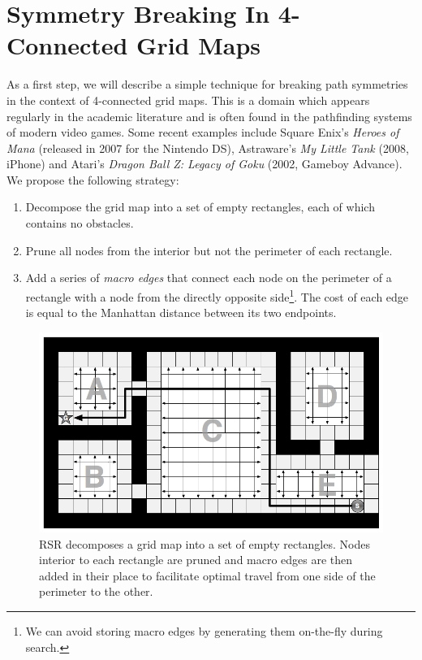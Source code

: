 \section{Symmetry Breaking In 4-Connected Grid Maps}
\label{cha::rsr::symm4c}

As a first step, we will describe a simple technique for breaking path symmetries 
in the context of 4-connected grid maps.
This is a domain which appears regularly in the academic literature
\citep{yap02,wang08,pochter10} and is often found in the pathfinding systems of
modern video games.  Some recent examples include Square Enix's \emph{Heroes of
Mana} (released in 2007 for the Nintendo DS), Astraware's \emph{My Little Tank}
(2008, iPhone) and Atari's \emph{Dragon Ball Z: Legacy of Goku} (2002, Gameboy
Advance). We propose the following strategy:

\begin{enumerate}
\item{Decompose the grid map into a set of empty rectangles, each of which contains no obstacles.}
\item{Prune all nodes from the interior but not the perimeter of each rectangle.}
\item{Add a series of \emph{macro edges} that connect each node on the perimeter of a rectangle
with a node from the directly opposite side\footnote{We can avoid storing macro edges by 
generating them on-the-fly during search.}.
The cost of each edge is equal to the Manhattan distance between its two endpoints.
}
\end{enumerate}

\begin{figure}[t]
\begin{center}
\includegraphics[scale=0.30, trim = 10mm 10mm 10mm 0mm]{chapter_rsr/diagrams/4c_example.png}
\end{center}
\vspace{-3pt}
\caption[Rectangular Symmetry Reduction on 4-connected maps]{
\small
RSR decomposes a grid map into a set of empty rectangles. 
Nodes interior to each rectangle are pruned and macro edges are then added 
in their place to facilitate optimal travel from one side of the perimeter to the other.}
\label{fig::rsr::overview}
\end{figure}

